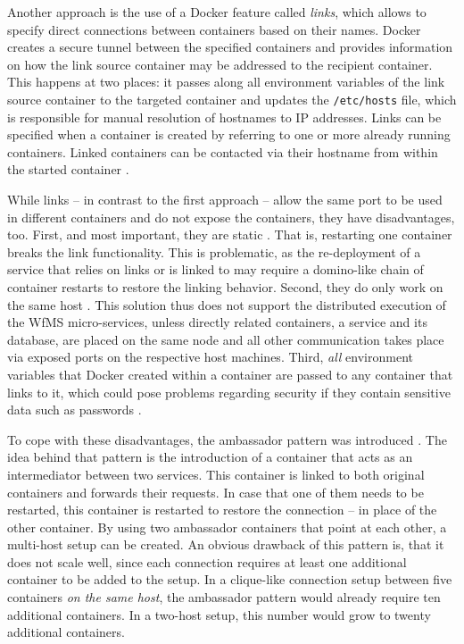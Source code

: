   Another approach is the use of a Docker feature called \emph{links}, which allows to specify direct connections between containers based on their names.
  Docker creates a secure tunnel between the specified containers and provides information on how the link source container may be addressed to the recipient container. This happens at two places: it passes along all environment variables of the link source container to the targeted container and updates the \texttt{/etc/hosts} file, which is responsible for manual resolution of hostnames to \ac{IP} addresses.
  Links can be specified when a container is created by referring to one or more already running containers.
  Linked containers can be contacted via their hostname from within the started container \cite{Docker2016Docker}.

  While links -- in contrast to the first approach -- allow the same port to be used in different containers and do not expose the containers, they have disadvantages, too.
  First, and most important, they are static \cite{Docker2016Docker}. That is, restarting one container breaks the link functionality. This is problematic, as the re-deployment of a service that relies on links or is linked to may require a domino-like chain of container restarts to restore the linking behavior.
  Second, they do only work on the same host \cite{Docker2016Docker}. This solution thus does not support the distributed execution of the \ac{WfMS} micro-services, unless directly related containers, \eg a service and its database, are placed on the same node and all other communication takes place via exposed ports on the respective host machines.
  Third, \emph{all} environment variables that Docker created within a container are passed to any container that links to it, which could pose problems regarding security if they contain sensitive data such as passwords \cite{Docker2016Docker}.

  To cope with these disadvantages, the ambassador pattern was introduced \cite{Docker2016Docker}. The idea behind that pattern is the introduction of a container that acts as an intermediator between two services. This container is linked to both original containers and forwards their requests. In case that one of them needs to be restarted, this container is restarted to restore the connection -- in place of the other container.
  By using two ambassador containers that point at each other, a multi-host setup can be created.
  An obvious drawback of this pattern is, that it does not scale well, since each connection requires at least one additional container to be added to the setup. In a clique-like connection setup between five containers \emph{on the same host}, the ambassador pattern would already require ten additional containers. In a two-host setup, this number would grow to twenty additional containers.

